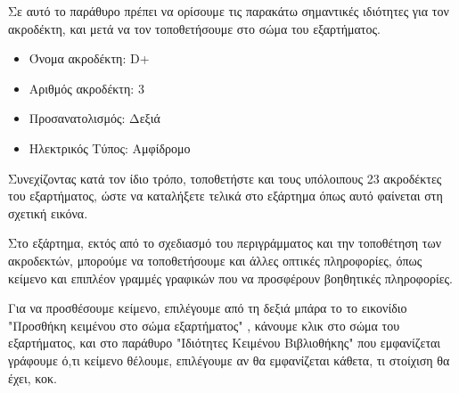 \documentclass[a4paper]{article}
\begin{document}
Σε αυτό το παράθυρο πρέπει να ορίσουμε τις παρακάτω σημαντικές ιδιότητες για τον ακροδέκτη, και μετά να τον τοποθετήσουμε στο σώμα του εξαρτήματος.

\begin{itemize}
    \item Όνομα ακροδέκτη: D+
    \item Αριθμός ακροδέκτη: 3
    \item Προσανατολισμός: Δεξιά
    \item Ηλεκτρικός Τύπος: Αμφίδρομο
\end{itemize}

\begin{figure}
  \begin{center}
    \label{fig:kicad-main}
  \end{center}
\end{figure}

Συνεχίζοντας κατά τον ίδιο τρόπο, τοποθετήστε και τους υπόλοιπους 23 ακροδέκτες του εξαρτήματος, ώστε να καταλήξετε τελικά στο εξάρτημα όπως αυτό φαίνεται στη σχετική εικόνα.

\begin{figure}
  \begin{center}
    \label{fig:kicad-main}
  \end{center}
\end{figure}

Στο εξάρτημα, εκτός από το σχεδιασμό του περιγράμματος και την τοποθέτηση των ακροδεκτών, μπορούμε να τοποθετήσουμε και άλλες οπτικές πληροφορίες, όπως κείμενο και επιπλέον γραμμές γραφικών που να προσφέρουν βοηθητικές πληροφορίες.

Για να προσθέσουμε κείμενο, επιλέγουμε από τη δεξιά μπάρα το το εικονίδιο "Προσθήκη κειμένου στο σώμα εξαρτήματος" %
, κάνουμε κλικ στο σώμα του εξαρτήματος, και στο παράθυρο "Ιδιότητες Κειμένου Βιβλιοθήκης" που εμφανίζεται γράφουμε ό,τι κείμενο θέλουμε, επιλέγουμε αν θα εμφανίζεται κάθετα, τι στοίχιση θα έχει, κοκ.

\begin{figure}
  \begin{center}
    \label{fig:kicad-main}
  \end{center}
\end{figure}
\end{document}
